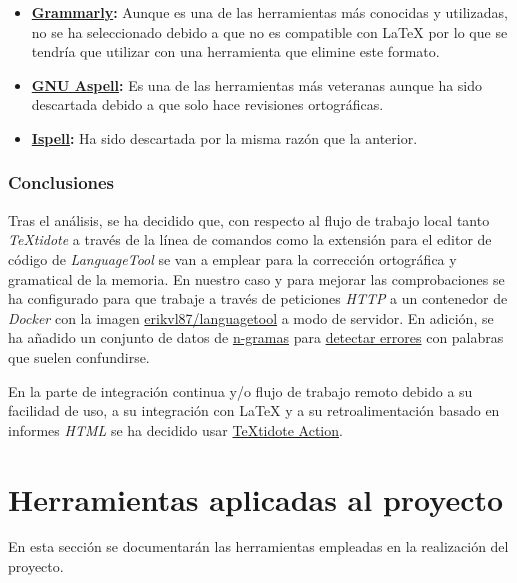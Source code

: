 \begin{itemize}
    \item \textbf{\href{https://www.grammarly.com/}{Grammarly}:} Aunque es una de las herramientas más conocidas y utilizadas, no se ha seleccionado debido a que no es compatible con \LaTeX{} por lo que se tendría que utilizar con una herramienta que elimine este formato.
    \item \textbf{\href{http://aspell.net/}{GNU Aspell}:} Es una de las herramientas más veteranas aunque ha sido descartada debido a que solo hace revisiones ortográficas.
    \item \textbf{\href{https://www.cs.hmc.edu/~geoff/ispell.html}{Ispell}:} Ha sido descartada por la misma razón que la anterior.
\end{itemize}

\subsubsection{Conclusiones}

Tras el análisis, se ha decidido que, con respecto al flujo de trabajo local tanto \textit{TeXtidote} a través de la línea de comandos como la extensión para el editor de código de \textit{LanguageTool} se van a emplear para la corrección ortográfica y gramatical de la memoria. En nuestro caso y para mejorar las comprobaciones se ha configurado para que trabaje a través de peticiones \textit{HTTP} a un contenedor de \textit{Docker} con la imagen \href{https://hub.docker.com/r/erikvl87/languagetool}{erikvl87/languagetool} a modo de servidor. En adición, se ha añadido un conjunto de datos de \href{https://es.wikipedia.org/wiki/N-grama}{n-gramas} para \href{https://dev.languagetool.org/finding-errors-using-n-gram-data}{detectar errores} con palabras que suelen confundirse.

En la parte de integración continua y/o flujo de trabajo remoto debido a su facilidad de uso, a su integración con \LaTeX{} y a su retroalimentación basado en informes \textit{HTML} se ha decidido usar \href{https://github.com/marketplace/actions/textidote-action}{TeXtidote Action}.

\section{Herramientas aplicadas al proyecto}

En esta sección se documentarán las herramientas empleadas en la realización del proyecto.

